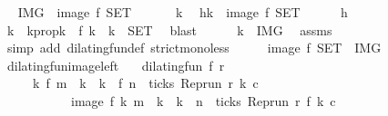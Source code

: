 \begin{isabellebody}
\ \isamarkupfalse%
\ {\isacartoucheopen}{\isacharquery}IMG\ {\isasymsubseteq}\ image\ f\ {\isacharquery}SET{\isacartoucheclose}\ \isacommand{{\isachardot}{\isachardot}}\isamarkupfalse%
\isanewline
{}\isamarkupfalse%
\isanewline
\ \ \isacommand{{\isacharbraceleft}}\isamarkupfalse%
\ \isamarkupfalse%
\ k\ \isamarkupfalse%
\ h{\isacharcolon}{\isacartoucheopen}k\ {\isasymin}\ image\ f\ {\isacharquery}SET{\isacartoucheclose}\isanewline
\ \ \ \ \isamarkupfalse%
\ h\ \isamarkupfalse%
\ k\ \ k{}prop{\isacharcolon}{\isacartoucheopen}k\ {\isacharequal}\ f\ k\ {\isasymand}\ k\ {\isasymin}\ {\isacharquery}SET{\isacartoucheclose}\ \isamarkupfalse%
\ blast\isanewline
\ \ \ \ \isamarkupfalse%
\ {\isacartoucheopen}k\ {\isasymin}\ {\isacharquery}IMG{\isacartoucheclose}\ \isamarkupfalse%
\ assms\ \isamarkupfalse%
\ {\isacharparenleft}simp\ add{\isacharcolon}\ dilating{\isacharunderscore}fun{\isacharunderscore}def\ strict{\isacharunderscore}mono{\isacharunderscore}less{\isacharparenright}\isanewline
\ \ \isacommand{{\isacharbraceright}}\isamarkupfalse%
\ \isamarkupfalse%
\ {\isacartoucheopen}image\ f\ {\isacharquery}SET\ {\isasymsubseteq}\ {\isacharquery}IMG{\isacartoucheclose}\ \isacommand{{\isachardot}{\isachardot}}\isamarkupfalse%
\isanewline
{}\isamarkupfalse%
%
\endisatagproof
{\isafoldproof}%
%
\isadelimproof
\isanewline
%
\endisadelimproof
\isanewline
{}\isamarkupfalse%
\ dilating{\isacharunderscore}fun{\isacharunderscore}image{\isacharunderscore}left{\isacharcolon}\isanewline
\ \ \ {\isacartoucheopen}dilating{\isacharunderscore}fun\ f\ r{\isacartoucheclose}\isanewline
\ \ \ \ \ {\isacartoucheopen}{\isacharbraceleft}k{\isachardot}\ f\ m\ {\isasymle}\ k\ {\isasymand}\ k\ {\isacharless}\ f\ n\ {\isasymand}\ ticks\ {\isacharparenleft}{\isacharparenleft}Rep{\isacharunderscore}run\ r{\isacharparenright}\ k\ c{\isacharparenright}{\isacharbraceright}\isanewline
\ \ \ \ \ \ \ \ \ \ {\isacharequal}\ image\ f\ {\isacharbraceleft}k{\isachardot}\ m\ {\isasymle}\ k\ {\isasymand}\ k\ {\isacharless}\ n\ {\isasymand}\ ticks\ {\isacharparenleft}{\isacharparenleft}Rep{\isacharunderscore}run\ r{\isacharparenright}\ {\isacharparenleft}f\ k{\isacharparenright}\ c{\isacharparenright}{\isacharbraceright}{\isacartoucheclose}\isanewline

\end{isabellebody}
